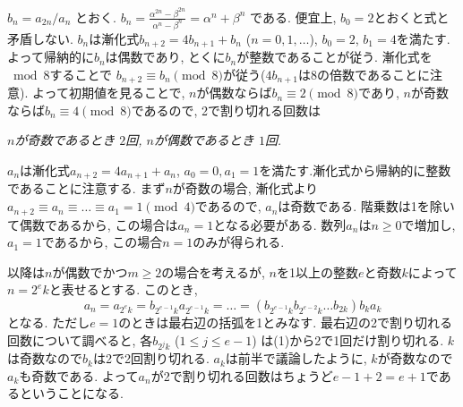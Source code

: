 $b_n = a_{2n}/a_n$ とおく. 
$b_n = \frac{\alpha^{2n} - \beta^{2n}}{\alpha^n - \beta^n} = \alpha^n + \beta^n$ である. 便宜上, $b_0 = 2$とおくと式と矛盾しない. $b_n$は漸化式$b_{n+2} = 4b_{n+1} + b_n$ ($n=0,1,\dots$), $b_0 = 2$, $b_1 = 4$を満たす. よって帰納的に$b_n$は偶数であり, とくに$b_n$が整数であることが従う. 漸化式を$\bmod{8}$することで $b_{n+2} \equiv b_n \pmod{8}$が従う($4b_{n+1}$は8の倍数であることに注意). よって初期値を見ることで, $n$が偶数ならば$b_n \equiv 2\pmod{8}$であり, $n$が奇数ならば$b_n\equiv 4\pmod{8}$であるので, 2で割り切れる回数は
\begin{center}
    \emph{$n$が奇数であるとき $2$回, \qquad $n$が偶数であるとき $1$回.}
\end{center}
$a_n$は漸化式$a_{n+2} =4a_{n+1} + a_n$, $a_0 = 0, a_1 = 1$を満たす.漸化式から帰納的に整数であることに注意する. まず$n$が奇数の場合, 漸化式より$a_{n+2}\equiv a_n \equiv\dots \equiv a_1 =1 \pmod{4}$であるので, $a_n$は奇数である. 階乗数は1を除いて偶数であるから, この場合は$a_n=1$となる必要がある. 数列$a_n$は$n\geq 0$で増加し, $a_1 = 1$であるから, この場合$n=1$のみが得られる.

以降は$n$が偶数でかつ$m\geq 2$の場合を考えるが, $n$を1以上の整数$e$と奇数$k$によって$n=2^e k$と表せるとする. このとき,
\[
a_{n} = a_{2^e k} = b_{2^{e-1}k}a_{2^{e-1}k} = \dots = (b_{2^{e-1}k}b_{2^{e-2}k} \dots b_{2k})b_ka_k
\]
となる. ただし$e=1$のときは最右辺の括弧を1とみなす. 最右辺の2で割り切れる回数について調べると, 各$b_{2^{j}k}$ ($1\leq j\leq e-1$) は(1)から2で1回だけ割り切れる. $k$は奇数なので$b_k$は2で2回割り切れる. $a_k$は前半で議論したように, $k$が奇数なので$a_k$も奇数である. よって$a_n$が2で割り切れる回数はちょうど$e-1 + 2 = e+1$であるということになる.

